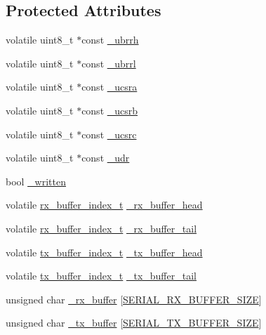 \subsection*{Protected Attributes}
\begin{DoxyCompactItemize}
\item 
volatile uint8\+\_\+t $\ast$const \hyperlink{class_hardware_serial_ac2dd0caa2b74a2992e1b9b0d63dec696}{\+\_\+ubrrh}
\item 
volatile uint8\+\_\+t $\ast$const \hyperlink{class_hardware_serial_ad61fd40f665d597de97ec3995e251e93}{\+\_\+ubrrl}
\item 
volatile uint8\+\_\+t $\ast$const \hyperlink{class_hardware_serial_a691bd409418c1acc6fc583692b54764f}{\+\_\+ucsra}
\item 
volatile uint8\+\_\+t $\ast$const \hyperlink{class_hardware_serial_a06c3d929aa3eb0e48227139d1750a3a7}{\+\_\+ucsrb}
\item 
volatile uint8\+\_\+t $\ast$const \hyperlink{class_hardware_serial_a3599c284453c515776147539d753d1bf}{\+\_\+ucsrc}
\item 
volatile uint8\+\_\+t $\ast$const \hyperlink{class_hardware_serial_a9123daf6c7d2bc8c3997d73f7b30bece}{\+\_\+udr}
\item 
bool \hyperlink{class_hardware_serial_a491255f295202ef6556a978224fdc71e}{\+\_\+written}
\item 
volatile \hyperlink{_hardware_serial_8h_a335e37d0726278844b068d565a4e66b7}{rx\+\_\+buffer\+\_\+index\+\_\+t} \hyperlink{class_hardware_serial_a797ebcc80bc2806b3ebbfc509e7aeabe}{\+\_\+rx\+\_\+buffer\+\_\+head}
\item 
volatile \hyperlink{_hardware_serial_8h_a335e37d0726278844b068d565a4e66b7}{rx\+\_\+buffer\+\_\+index\+\_\+t} \hyperlink{class_hardware_serial_a0343d5d99eb23a56dd3ad5b48928a94a}{\+\_\+rx\+\_\+buffer\+\_\+tail}
\item 
volatile \hyperlink{_hardware_serial_8h_a20cdd352151af0ecef9f3f68c8b20256}{tx\+\_\+buffer\+\_\+index\+\_\+t} \hyperlink{class_hardware_serial_abc7b62797e816bc704bfe3ec80f68607}{\+\_\+tx\+\_\+buffer\+\_\+head}
\item 
volatile \hyperlink{_hardware_serial_8h_a20cdd352151af0ecef9f3f68c8b20256}{tx\+\_\+buffer\+\_\+index\+\_\+t} \hyperlink{class_hardware_serial_a3aad9ccd1bebab9d9226e0c38ee54465}{\+\_\+tx\+\_\+buffer\+\_\+tail}
\item 
unsigned char \hyperlink{class_hardware_serial_ae33d584001d6c3fbbc6a8097b0ab19c7}{\+\_\+rx\+\_\+buffer} \mbox{[}\hyperlink{_hardware_serial_8h_aba0ceec384cf3acb51e0d6f45f31379c}{S\+E\+R\+I\+A\+L\+\_\+\+R\+X\+\_\+\+B\+U\+F\+F\+E\+R\+\_\+\+S\+I\+Z\+E}\mbox{]}
\item 
unsigned char \hyperlink{class_hardware_serial_ae29711a762cbc9a7f622b4f4ff64d374}{\+\_\+tx\+\_\+buffer} \mbox{[}\hyperlink{_hardware_serial_8h_af0d9a9a9aac810bf58f698086f76e516}{S\+E\+R\+I\+A\+L\+\_\+\+T\+X\+\_\+\+B\+U\+F\+F\+E\+R\+\_\+\+S\+I\+Z\+E}\mbox{]}
\end{DoxyCompactItemize}
